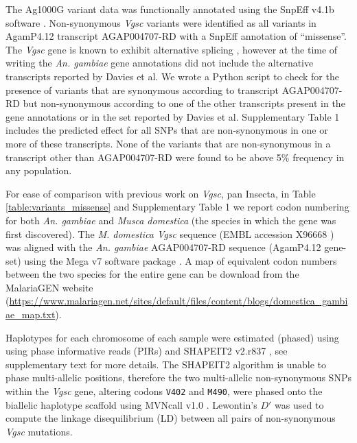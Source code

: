 \documentclass[a4paper,11pt,abstracton,hidelinks]{scrartcl}
\begin{document}
%
The Ag1000G variant data was functionally annotated using the SnpEff v4.1b software \cite{Cingolani2012}.
%
Non-synonymous \emph{Vgsc} variants were identified as all variants in AgamP4.12 transcript AGAP004707-RD with a SnpEff annotation of ``missense''.
%
The \emph{Vgsc} gene is known to exhibit alternative splicing \cite{Davies2007a}, however at the time of writing the \textit{An. gambiae} gene annotations did not include the alternative transcripts reported by Davies et al.
%
We wrote a Python script to check for the presence of variants that are synonymous according to transcript AGAP004707-RD but non-synonymous according to one of the other transcripts present in the gene annotations or in the set reported by Davies et al.
%
Supplementary Table 1 includes the predicted effect for all SNPs that are non-synonymous in one or more of these transcripts.
%
None of the variants that are non-synonymous in a transcript other than AGAP004707-RD were found to be above 5\% frequency in any population.
%

%
For ease of comparison with previous work on \emph{Vgsc}, pan Insecta, in Table \ref{table:variants_missense} and Supplementary Table 1 we report codon numbering for both \emph{An. gambiae} and \emph{Musca domestica} (the species in which the gene was first discovered).
%
The \emph{M. domestica Vgsc} sequence (EMBL accession X96668 \cite{Williamson1996}) was aligned with the \emph{An. gambiae} AGAP004707-RD sequence (AgamP4.12 gene-set) using the Mega v7 software package \cite{Kumar2016}.
%
A map of equivalent codon numbers between the two species for the entire gene can be download from the MalariaGEN website (\url{https://www.malariagen.net/sites/default/files/content/blogs/domestica_gambiae_map.txt}).

%
Haplotypes for each chromosome of each sample were estimated (phased) using using phase informative reads (PIRs) and SHAPEIT2 v2.r837 \cite{Delaneau2013}, see \cite{Ag1000gConsortium2017} supplementary text for more details.
%
The SHAPEIT2 algorithm is unable to phase multi-allelic positions, therefore the two multi-allelic non-synonymous SNPs within the \emph{Vgsc} gene, altering codons \texttt{V402} and \texttt{M490}, were phased onto the biallelic haplotype scaffold using MVNcall v1.0 \cite{Menelaou2013}.
%
Lewontin's $D'$ \cite{Lewontin1964} was used to compute the linkage disequilibrium (LD) between all pairs of non-synonymous \emph{Vgsc} mutations.


\end{document}
